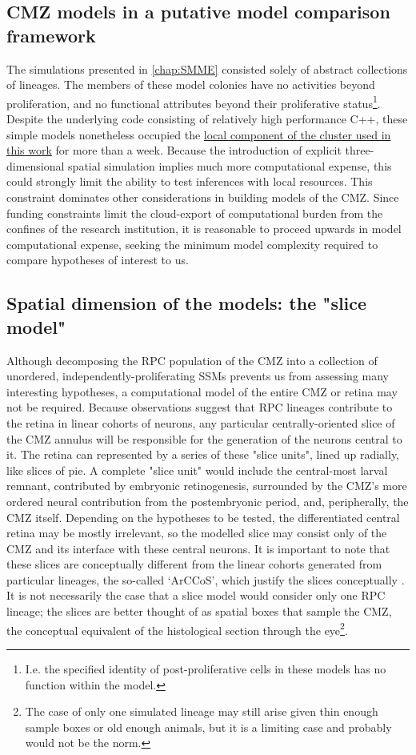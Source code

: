 \documentclass{ut-thesis}
\begin{document}
\begin{NoHyper}
\section{CMZ models in a putative model comparison framework}
The simulations presented in \autoref{chap:SMME} consisted solely of abstract collections of lineages. The members of these model colonies have no activities beyond proliferation, and no functional attributes beyond their proliferative status\footnote{I.e. the specified identity of post-proliferative cells in these models has no function within the model.}. Despite the underlying code consisting of relatively high performance C++, these simple models nonetheless occupied the \hyperref[sec:cluster]{local component of the cluster used in this work} for more than a week. Because the introduction of explicit three-dimensional spatial simulation implies much more computational expense, this could strongly limit the ability to test inferences with local resources. This constraint dominates other considerations in building models of the CMZ. Since funding constraints limit the cloud-export of computational burden from the confines of the research institution, it is reasonable to proceed upwards in model computational expense, seeking the minimum model complexity required to compare hypotheses of interest to us.

\subsection{Spatial dimension of the models: the "slice model"}
\label{ssec:slice}
Although decomposing the RPC population of the CMZ into a collection of unordered, independently-proliferating SSMs prevents us from assessing many interesting hypotheses, a computational model of the entire CMZ or retina may not be required. Because observations suggest that RPC lineages contribute to the retina in linear cohorts of neurons, any particular centrally-oriented slice of the CMZ annulus will be responsible for the generation of the neurons central to it. The retina can represented by a series of these "slice units", lined up radially, like slices of pie. A complete "slice unit" would include the central-most larval remnant, contributed by embryonic retinogenesis, surrounded by the CMZ's more ordered neural contribution from the postembryonic period, and, peripherally, the CMZ itself. Depending on the hypotheses to be tested, the differentiated central retina may be mostly irrelevant, so the modelled slice may consist only of the CMZ and its interface with these central neurons. It is important to note that these slices are conceptually different from the linear cohorts generated from particular lineages, the so-called `ArCCoS', which justify the slices conceptually \cite{Centanin2011}. It is not necessarily the case that a slice model would consider only one RPC lineage; the slices are better thought of as spatial boxes that sample the CMZ, the conceptual equivalent of the histological section through the eye\footnote{The case of only one simulated lineage may still arise given thin enough sample boxes or old enough animals, but it is a limiting case and probably would not be the norm.}.


\end{NoHyper}
\end{document}
